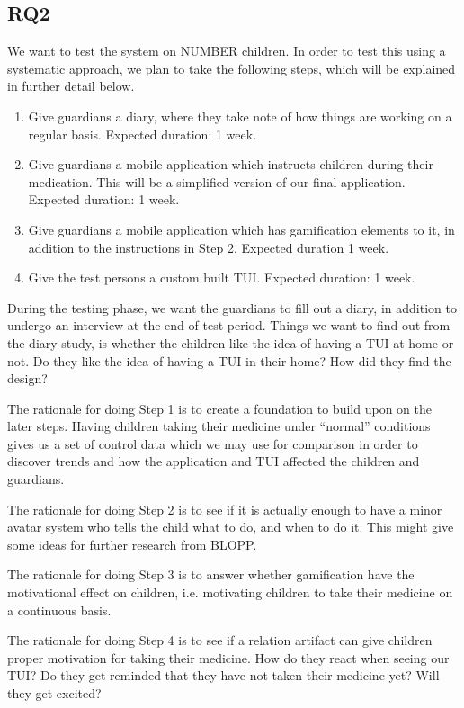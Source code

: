 \subsection{RQ2}
\label{sec:RQ2-methodology}
We want to test the system on NUMBER children. In order to test this using a systematic approach, we plan to take the following steps, which will be explained in further detail below. 
\begin{enumerate}
  \item Give guardians a diary, where they take note of how things are working on a regular basis. Expected duration: 1 week.
  \item Give guardians a mobile application which instructs children during their medication. This will be a simplified version of our final application. Expected duration: 1 week. 
  \item Give guardians a mobile application which has gamification elements to it, in addition to the instructions in Step 2. Expected duration 1 week.   
  \item Give the test persons a custom built TUI. Expected duration: 1 week. 
\end{enumerate}
During the testing phase, we want the guardians to fill out a diary, in addition to undergo an interview at the end of test period. Things we want to find out from the diary study, is whether the children like the idea of having a TUI at home or not. Do they like the idea of having a TUI in their home? How did they find the design?

The rationale for doing Step 1 is to create a foundation to build upon on the later steps. Having children taking their medicine under ``normal'' conditions gives us a set of control data which we may use for comparison in order to discover trends and how the application and TUI affected the children and guardians. 


The rationale for doing Step 2 is to see if it is actually enough to have a minor avatar system who tells the child what to do, and when to do it. This might give some ideas for further research from BLOPP. 


The rationale for doing Step 3 is to answer whether gamification have the motivational effect on children, i.e. motivating children to take their medicine on a continuous basis. 


The rationale for doing Step 4 is to see if a relation artifact can give children proper motivation for taking their medicine. How do they react when seeing our TUI? Do they get reminded that they have not taken their medicine yet? Will they get excited? 


